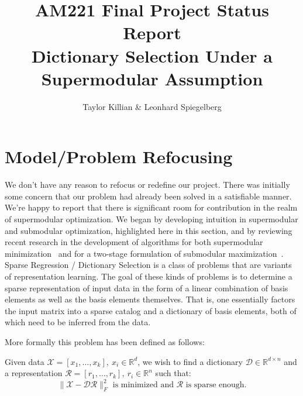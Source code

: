 \documentclass{article}
\newcommand{\R}{\mathbb{R}}
\begin{document}
\title{AM221 Final Project Status Report \\ \large Dictionary Selection Under a Supermodular Assumption}
\author{Taylor Killian \& Leonhard Spiegelberg}
\maketitle

%

\section{Model/Problem Refocusing} \label{model}
We don't have any reason to refocus or redefine our project. There was initially some concern that our problem had already been solved in a satisfiable manner. We're happy to report that there is significant room for contribution in the realm of supermodular optimization. We began by developing intuition in supermodular and submodular optimization, highlighted here in this section, and by reviewing recent research in the development of algorithms for both supermodular minimization~\cite{BoutsidisLS15} and for a two-stage formulation of submodular maximization~\cite{Singer16TwoStage}. 
\\

\noindent Sparse Regression / Dictionary Selection is a class of problems that are variants of representation learning. The goal of these kinds of problems is to determine a sparse representation of input data in the form of a linear combination of basis elements as well as the basis elements themselves. That is, one essentially factors the input matrix into a sparse catalog and a dictionary of basis elements, both of which need to be inferred from the data.
\newline

\noindent More formally this problem has been defined as follows:
\newline

Given data $\mathcal{X} = [x_1,\dots , x_k], \ x_i\in\R^d$, we wish to find a dictionary $\mathcal{D}\in\R^{d \times n}$ and a representation $\mathcal{R} = [r_1, \dots, r_k], \ r_i\in\R^n$ such that: $$\|\mathcal{X}-\mathcal{D}\mathcal{R}\|_F^2 \text{ is minimized and } \mathcal{R} \text{ is sparse enough.}$$
\end{document}

